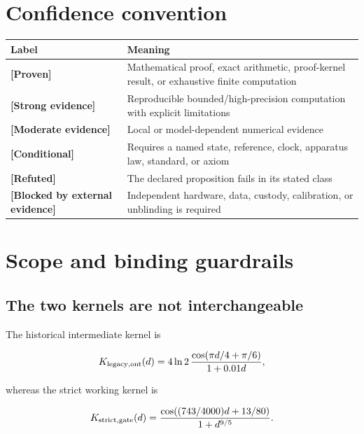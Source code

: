 \documentclass[11pt,a4paper,openany]{report}
\newcommand{\statusProven}{\textcolor{fingreen}{[Proven]}}
\newcommand{\statusStrong}{\textcolor{finblue}{[Strong evidence]}}
\newcommand{\statusModerate}{\textcolor{finviolet}{[Moderate evidence]}}
\newcommand{\statusRefuted}{\textcolor{finred}{[Refuted]}}
\begin{document}
\tableofcontents
\clearpage
{}

\chapter*{Confidence convention}

\begin{center}
\begingroup\small
\setlength{\tabcolsep}{2.5pt}
\renewcommand{\arraystretch}{1.16}
\begin{longtable}{@{}p{}p{}@{}}
\toprule
\textbf{Label} & \textbf{Meaning} \\
\midrule
\endhead
\textbf{\statusProven{}} & Mathematical proof, exact arithmetic, proof-kernel result, or exhaustive finite computation \\
\textbf{\statusStrong{}} & Reproducible bounded/\allowbreak{}high-precision computation with explicit limitations \\
\textbf{\statusModerate{}} & Local or model-dependent numerical evidence \\
\textbf{[Conditional]} & Requires a named state, reference, clock, apparatus law, standard, or axiom \\
\textbf{\statusRefuted{}} & The declared proposition fails in its stated class \\
\textbf{[Blocked by external evidence]} & Independent hardware, data, custody, calibration, or unblinding is required \\
\bottomrule
\end{longtable}
\endgroup
\end{center}

\chapter{Scope and binding guardrails}

\section{The two kernels are not interchangeable}

The historical intermediate kernel is

\[
K_{\rm legacy,ont}(d)
=4\ln2\,
\frac{\cos(\pi d/4+\pi/6)}{1+0.01d},
\]

whereas the strict working kernel is

\[
K_{\rm strict,gate}(d)
=\frac{\cos((743/4000)d+13/80)}{1+d^{9/5}}.
\]
\end{document}
